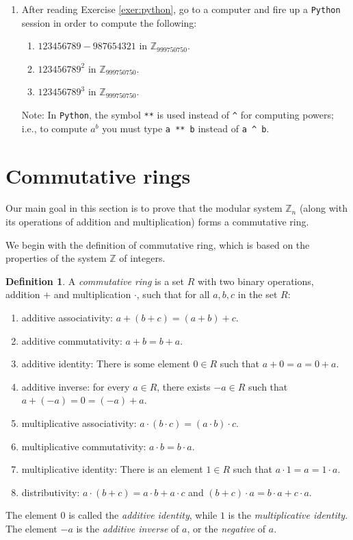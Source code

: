 \documentclass[11pt]{article}
\newenvironment{problems}
{
 \begin{enumerate}[topsep=1pt,itemsep=0pt,parsep=2pt,leftmargin=0.6cm,%
 label={\arabic*.}, ref=\arabic*] \small
}
{
 \end{enumerate}
}
\theoremstyle{definition}
\newtheorem{defn}[thm]{Definition}
\newcommand{\Z}{\mathbb{Z}} %
\begin{document}
\begin{problems}
\item After reading Exercise \ref{exer:python}, go to a computer and
  fire up a \texttt{Python} session in order to compute the following:
  \begin{enumerate}
  \item $123456789 - 987654321$ in $\Z_{999750750}$.
  \item $123456789^2$ in $\Z_{999750750}$.
  \item $123456789^3$ in $\Z_{999750750}$.
  \end{enumerate}
  Note: In \texttt{Python}, the symbol \verb$**$ is used instead of
  \verb$^$ for computing powers; i.e., to compute $a^b$ you must type
  \verb$a ** b$ instead of \verb$a ^ b$.

\end{problems}



\newpage\section{Commutative rings}\noindent
Our main goal in this section is to prove that the modular system
$\Z_n$ (along with its operations of addition and multiplication)
forms a commutative ring.

We begin with the definition of commutative ring, which is based on
the properties of the system $\Z$ of integers.


\begin{defn} \label{def:comm-ring}
A {\em commutative ring} is a set $R$ with two binary
operations, addition $+$ and multiplication $\cdot$, such that for all
$a,b,c$ in the set $R$:
  \begin{enumerate}
  \item additive associativity: $a + (b+c) = (a+b)+c$.
  \item additive commutativity: $a+b = b+a$. 
  \item additive identity: There is some element $0 \in R$ such that
    $a+0 = a = 0+a$.
  \item additive inverse: for every $a\in R$, there exists $-a \in R$
    such that $a + (-a) = 0 = (-a)+a$.
  
  \item multiplicative associativity: $a \cdot (b\cdot c) = (a\cdot
    b)\cdot c$.
  \item multiplicative commutativity: $a\cdot b = b\cdot a$. 
  \item multiplicative identity: There is an element $1 \in R$ such
    that $a\cdot 1 = a = 1\cdot a$.
 
  \item distributivity: $a\cdot (b+c) = a\cdot b + a \cdot c$ and
    $(b+c)\cdot a = b\cdot a + c \cdot a$.
  \end{enumerate}
The element $0$ is called the \emph{additive identity}, while $1$ is
the \emph{multiplicative identity}. The element $-a$ is the
\emph{additive inverse} of $a$, or the \emph{negative} of $a$.
\end{defn}
\end{document}
